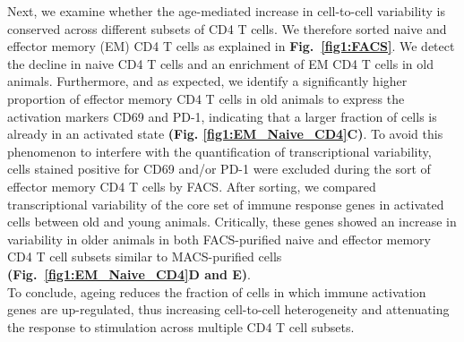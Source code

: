 Next, we examine whether the age-mediated increase in cell-to-cell variability is conserved across different subsets of CD4\plus{} T cells. We therefore sorted naive and effector memory (EM) CD4\plus{} T cells as explained in \textbf{Fig.~\ref{fig1:FACS}}. We detect the decline in naive CD4\plus{} T cells and an enrichment of EM CD4\plus{} T cells in old animals. Furthermore, and as expected, we identify a significantly higher proportion of effector memory CD4\plus{} T cells in old animals to express the activation markers CD69 and PD-1, indicating that a larger fraction of cells is already in an activated state \textbf{(Fig. \ref{fig1:EM_Naive_CD4}C)}. To avoid this phenomenon to interfere with the quantification of transcriptional variability, cells stained positive for CD69 and/or PD-1 were excluded during the sort of effector memory CD4\plus{} T cells by FACS. After sorting, we compared transcriptional variability of the core set of immune response genes in activated cells between old and young animals. Critically, these genes showed an increase in variability in older animals in both FACS-purified naive and effector memory CD4\plus{} T cell subsets similar to MACS-purified cells  \textbf{(Fig.~\ref{fig1:EM_Naive_CD4}D and E)}.\\

To conclude, ageing reduces the fraction of cells in which immune activation genes are up-regulated, thus increasing cell-to-cell heterogeneity and attenuating the response to stimulation across multiple CD4\plus{} T cell subsets.

\newpage

